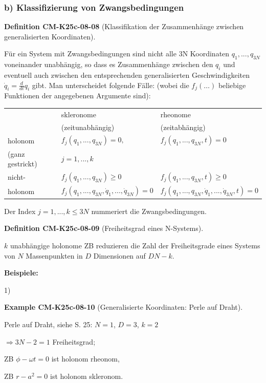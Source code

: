 \documentclass[10pt, letterpaper]{article}
\newcommand{\CustomHeading}[3]{%
  \par\medskip\noindent%
  \textbf{#1 #2} \textnormal{(#3)}.\enskip%
}
\newenvironment{DEF}[2]{\begin{unitbox}\CustomHeading{Definition}{#1}{#2}}{\end{unitbox}}
\newenvironment{EXA}[2]{\begin{unitbox}\CustomHeading{Example}{#1}{#2}}{\end{unitbox}}
\begin{document}
\subsubsection{b) Klassifizierung von Zwangsbedingungen}



\begin{DEF}{CM-K25c-08-08}{Klassifikation der Zusammenhänge zwischen generalisierten Koordinaten}
Für ein System mit Zwangsbedingungen sind nicht alle 3N Koordinaten $q_1,...,q_{3N}$ voneinander unabhängig, so dass es Zusammenhänge zwischen den $q_i$ und eventuell auch zwischen den entsprechenden generalisierten Geschwindigkeiten $\dot{q}_i = \frac{d}{dt}q_i$ gibt. Man unterscheidet folgende Fälle: (wobei die $f_j(\dots)$ beliebige Funktionen der angegebenen Argumente sind):

\begin{tabular}{|l|l|l|}
\hline
 & skleronome & rheonome \\
 & (zeitunabhängig) & (zeitabhängig) \\
\hline
holonom & $f_j(q_1,...,q_{3N}) = 0,$ & $f_j(q_1,...,q_{3N},t) = 0$ \\
(ganz gestrickt) & $j = 1,...,k$ & \\
\hline
nicht- & $f_j(q_1,...,q_{3N}) \geq 0$ & $f_j(q_1,...,q_{3N},t) \geq 0$ \\
holonom & $f_j(q_1,...,q_{3N},\dot{q}_1,...,\dot{q}_{3N}) = 0$ & $f_j(q_1,...,q_{3N},\dot{q}_1,...,\dot{q}_{3N},t) = 0$ \\
\hline
\end{tabular}

Der Index $j = 1,...,k \leq 3N$ nummeriert die Zwangsbedingungen.
\end{DEF}


\begin{DEF}{CM-K25c-08-09}{Freiheitsgrad eines N-Systems}
$k$ unabhängige holonome ZB reduzieren die Zahl der Freiheitsgrade eines Systems von $N$ Massenpunkten in $D$ Dimensionen auf $DN-k$.
\end{DEF}

\textbf{Beispiele:}

1) 

\begin{EXA}{CM-K25c-08-10}{Generalisierte Koordinaten: Perle auf Draht}
Perle auf Draht, siehe S. 25: $N=1$, $D=3$, $k=2$
   
   $\Rightarrow 3N-2 = 1$ Freiheitsgrad;
   
   ZB $\phi - \omega t = 0$ ist holonom rheonom,
   
   ZB $r-a^2 = 0$ ist holonom skleronom.
\end{EXA}
\end{document}
